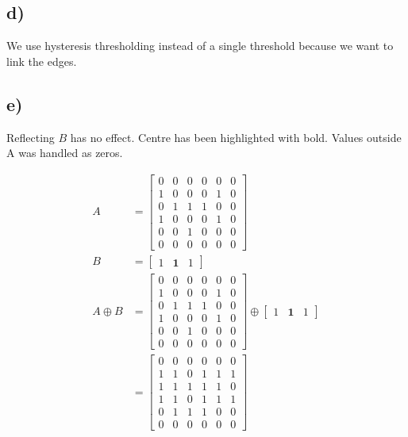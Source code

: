 \subsection*{d)}
We use hysteresis thresholding instead of a single threshold because we want to link the edges. 

\subsection*{e)}
Reflecting $B$ has no effect. Centre has been highlighted with bold. Values outside A was handled as zeros. 

\begin{align*}
    A &= \begin{bmatrix}
        0 & 0 & 0 & 0 & 0 & 0 \\
        1 & 0 & 0 & 0 & 1 & 0 \\ 
        0 & 1 & 1 & 1 & 0 & 0 \\ 
        1 & 0 & 0 & 0 & 1 & 0 \\ 
        0 & 0 & 1 & 0 & 0 & 0 \\ 
        0 & 0 & 0 & 0 & 0 & 0 
    \end{bmatrix} \\ 
    B &= \begin{bmatrix}
        1 & \mathbf{1} & 1
    \end{bmatrix} \\ 
    A \oplus B &= \begin{bmatrix}
        0 & 0 & 0 & 0 & 0 & 0 \\
        1 & 0 & 0 & 0 & 1 & 0 \\ 
        0 & 1 & 1 & 1 & 0 & 0 \\ 
        1 & 0 & 0 & 0 & 1 & 0 \\ 
        0 & 0 & 1 & 0 & 0 & 0 \\ 
        0 & 0 & 0 & 0 & 0 & 0 
    \end{bmatrix} \oplus \begin{bmatrix}
        1 & \mathbf{1} & 1
    \end{bmatrix} \\ 
    &= \begin{bmatrix}
        0 & 0 & 0 & 0 & 0 & 0 \\
        1 & 1 & 0 & 1 & 1 & 1 \\
        1 & 1 & 1 & 1 & 1 & 0 \\ 
        1 & 1 & 0 & 1 & 1 & 1 \\ 
        0 & 1 & 1 & 1 & 0 & 0 \\ 
        0 & 0 & 0 & 0 & 0 & 0 
    \end{bmatrix}
\end{align*}





